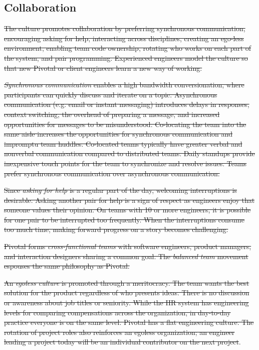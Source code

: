 \subsection{Collaboration}
\sout{The culture promotes collaboration by preferring synchronous communication, encouraging asking for help, interacting across disciplines, creating an ego-less environment, enabling team code ownership, rotating who works on each part of the system, and pair programming. Experienced engineers model the culture so that new Pivotal or client engineers learn a new way of working.}


\sout{\textit{Synchronous communication} enables a high bandwidth conversionation, where participants can quickly discuss and iterate on a topic. Asynchronous communication (e.g. email or instant messaging) introduces delays in responses, context switching, the overhead of preparing a message, and increased opportunities for messages to be misunderstood. Co-locating the team into the same aisle increases the opportunities for synchronous communication and impromptu team huddles.  Co-located teams typically have greater verbal and nonverbal communication compared to distributed teams. Daily standups provide inexpensive touch points for the team to synchronize and resolve issues. Teams prefer synchronous communication over asynchronous communication. }


\sout{Since \textit{asking for help} is a regular part of the day, welcoming interruptions is desirable. Asking another pair for help is a sign of respect as engineers enjoy that someone values their opinion. On teams with 10 or more engineers, it is possible for one pair to be interrupted too frequently. When the interruptions consume too much time, making forward progress on a story becomes challenging. }


\sout{Pivotal forms \textit{cross-functional teams} with software engineers, product managers, and interaction designers sharing a common goal. The \textit{balanced team} movement espouses the same philosophy as Pivotal. }


\sout{An \textit{egoless culture} is promoted through a meritocracy. The team wants the best solution for the product regardless of who presents ideas. There is no discussion or awareness about job titles or seniority. While the HR system has engineering levels for comparing compensations across the organization, in day-to-day practice everyone is on the same level. Pivotal has a flat engineering culture. The rotation of project roles also reinforces an egoless organization; an engineer leading a project today will be an individual contributor on the next project}. 


